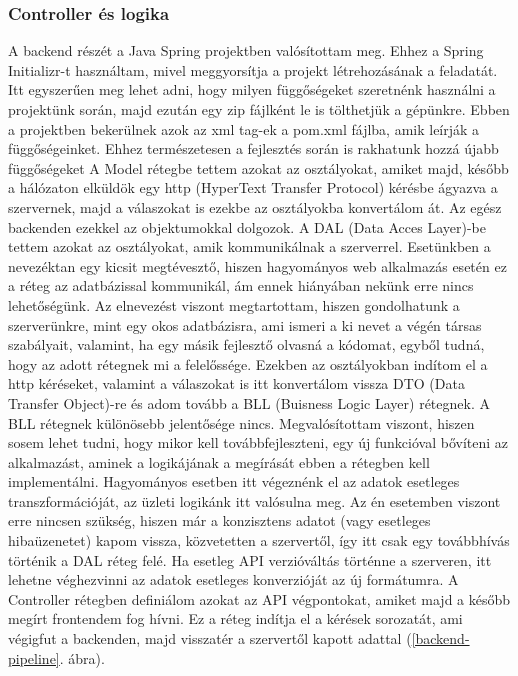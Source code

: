 \documentclass[a4paper,twoside]{article}
\begin{document}
\subsubsection{Controller és logika}
A backend részét a Java Spring projektben valósítottam meg. Ehhez a Spring Initializr-t használtam, mivel meggyorsítja a projekt létrehozásának a feladatát. Itt
egyszerűen meg lehet adni, hogy milyen függőségeket szeretnénk használni a projektünk során, majd ezután egy zip fájlként le is tölthetjük a gépünkre. Ebben a projektben bekerülnek azok az xml tag-ek a pom.xml fájlba, amik leírják a függőségeinket. Ehhez természetesen a fejlesztés során is rakhatunk hozzá újabb függőségeket
A Model rétegbe tettem azokat az osztályokat, amiket majd, később a hálózaton elküldök egy
http (HyperText Transfer Protocol) kérésbe ágyazva a szervernek, majd a válaszokat is ezekbe
az osztályokba konvertálom át. Az egész backenden ezekkel az objektumokkal dolgozok.
A DAL (Data Acces Layer)-be tettem azokat az osztályokat, amik kommunikálnak a
szerverrel. Esetünkben a nevezéktan egy kicsit megtévesztő, hiszen hagyományos web
alkalmazás esetén ez a réteg az adatbázissal kommunikál, ám ennek hiányában nekünk erre
nincs lehetőségünk. Az elnevezést viszont megtartottam, hiszen gondolhatunk a szerverünkre,
mint egy okos adatbázisra, ami ismeri a ki nevet a végén társas szabályait, valamint, ha egy
másik fejlesztő olvasná a kódomat, egyből tudná, hogy az adott rétegnek mi a felelőssége.
Ezekben az osztályokban indítom el a http kéréseket, valamint a válaszokat is itt konvertálom
vissza DTO (Data Transfer Object)-re és adom tovább a BLL (Buisness Logic Layer)
rétegnek.
A BLL rétegnek különösebb jelentősége nincs. Megvalósítottam viszont, hiszen sosem lehet
tudni, hogy mikor kell továbbfejleszteni, egy új funkcióval bővíteni az alkalmazást, aminek a
logikájának a megírását ebben a rétegben kell implementálni. Hagyományos esetben itt
végeznénk el az adatok esetleges transzformációját, az üzleti logikánk itt valósulna meg. Az
én esetemben viszont erre nincsen szükség, hiszen már a konzisztens adatot (vagy esetleges
hibaüzenetet) kapom vissza, közvetetten a szervertől, így itt csak egy továbbhívás történik a
DAL réteg felé. Ha esetleg API verzióváltás történne a szerveren, itt lehetne véghezvinni az adatok esetleges konverzióját az új formátumra.
A Controller rétegben definiálom azokat az API végpontokat, amiket majd a később megírt
frontendem fog hívni. Ez a réteg indítja el a kérések sorozatát, ami végigfut a backenden,
majd visszatér a szervertől kapott adattal (\ref{backend-pipeline}. ábra).
\end{document}
